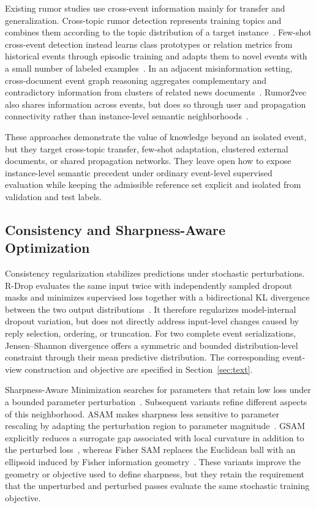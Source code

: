 \documentclass[sigconf,anonymous,review]{../acmart/acmart}
\begin{document}
Existing rumor studies use cross-event information mainly for transfer and
generalization. Cross-topic rumor detection represents training topics and
combines them according to the topic distribution of a target
instance~\cite{ren2021crosstopic}. Few-shot cross-event detection instead
learns class prototypes or relation metrics from historical events through
episodic training and adapts them to novel events with a small number of
labeled examples~\cite{ran2023metacross}. In an adjacent misinformation
setting, cross-document event graph reasoning aggregates complementary and
contradictory information from clusters of related news
documents~\cite{wu2022crossdoc}. Rumor2vec also shares information across
events, but does so through user and propagation connectivity rather than
instance-level semantic neighborhoods~\cite{tu2021rumor2vec}.

These approaches demonstrate the value of knowledge beyond an isolated event,
but they target cross-topic transfer, few-shot adaptation, clustered external
documents, or shared propagation networks. They leave open how to expose
instance-level semantic precedent under ordinary event-level supervised
evaluation while keeping the admissible reference set explicit and isolated
from validation and test labels.

\subsection{Consistency and Sharpness-Aware Optimization}

Consistency regularization stabilizes predictions under stochastic
perturbations. R-Drop evaluates the same input twice with independently
sampled dropout masks and minimizes supervised loss together with a
bidirectional KL divergence between the two output
distributions~\cite{liang2021rdrop}. It therefore regularizes model-internal
dropout variation, but does not directly address input-level changes caused by
reply selection, ordering, or truncation. For two complete event
serializations, Jensen--Shannon divergence offers a symmetric and bounded
distribution-level constraint through their mean predictive distribution.
The corresponding event-view construction and objective are specified in
Section~\ref{sec:text}.

Sharpness-Aware Minimization searches for parameters that retain low loss
under a bounded parameter perturbation~\cite{foret2021sam}. Subsequent
variants refine different aspects of this neighborhood. ASAM makes sharpness
less sensitive to parameter rescaling by adapting the perturbation region to
parameter magnitude~\cite{kwon2021asam}. GSAM explicitly reduces a surrogate
gap associated with local curvature in addition to the perturbed
loss~\cite{zhuang2022gsam}, whereas Fisher SAM replaces the Euclidean ball
with an ellipsoid induced by Fisher information
geometry~\cite{kim2022fishersam}. These variants improve the geometry or
objective used to define sharpness, but they retain the requirement that the
unperturbed and perturbed passes evaluate the same stochastic training
objective.
\end{document}
